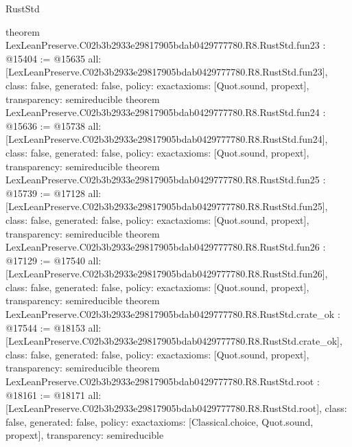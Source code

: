 \begin{lexlean}{RustStd}
\begin{coremodule}
{}
theorem LexLeanPreserve.C02b3b2933e29817905bdab0429777780.R8.RustStd.fun23 : @15404 := @15635 {
  all: [LexLeanPreserve.C02b3b2933e29817905bdab0429777780.R8.RustStd.fun23],
  class: false,
  generated: false,
  policy: exact{axioms: [Quot.sound, propext]},
  transparency: semireducible
}
theorem LexLeanPreserve.C02b3b2933e29817905bdab0429777780.R8.RustStd.fun24 : @15636 := @15738 {
  all: [LexLeanPreserve.C02b3b2933e29817905bdab0429777780.R8.RustStd.fun24],
  class: false,
  generated: false,
  policy: exact{axioms: [Quot.sound, propext]},
  transparency: semireducible
}
theorem LexLeanPreserve.C02b3b2933e29817905bdab0429777780.R8.RustStd.fun25 : @15739 := @17128 {
  all: [LexLeanPreserve.C02b3b2933e29817905bdab0429777780.R8.RustStd.fun25],
  class: false,
  generated: false,
  policy: exact{axioms: [Quot.sound, propext]},
  transparency: semireducible
}
theorem LexLeanPreserve.C02b3b2933e29817905bdab0429777780.R8.RustStd.fun26 : @17129 := @17540 {
  all: [LexLeanPreserve.C02b3b2933e29817905bdab0429777780.R8.RustStd.fun26],
  class: false,
  generated: false,
  policy: exact{axioms: [Quot.sound, propext]},
  transparency: semireducible
}
theorem LexLeanPreserve.C02b3b2933e29817905bdab0429777780.R8.RustStd.crate_ok : @17544 := @18153 {
  all: [LexLeanPreserve.C02b3b2933e29817905bdab0429777780.R8.RustStd.crate_ok],
  class: false,
  generated: false,
  policy: exact{axioms: [Quot.sound, propext]},
  transparency: semireducible
}
theorem LexLeanPreserve.C02b3b2933e29817905bdab0429777780.R8.RustStd.root : @18161 := @18171 {
  all: [LexLeanPreserve.C02b3b2933e29817905bdab0429777780.R8.RustStd.root],
  class: false,
  generated: false,
  policy: exact{axioms: [Classical.choice, Quot.sound, propext]},
  transparency: semireducible
}


\end{coremodule}
\end{lexlean}
